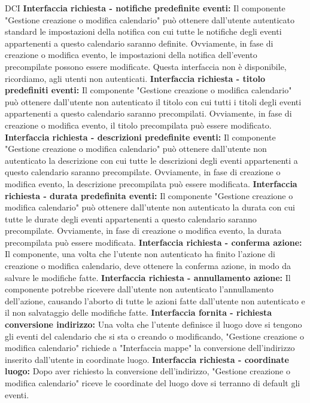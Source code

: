 \begin{listaPersonale}{DCI}
    \textbf{Interfaccia richiesta - notifiche predefinite eventi:} Il componente "Gestione creazione o modifica calendario" può ottenere dall'utente autenticato standard le impostazioni della notifica con cui tutte le notifiche degli eventi appartenenti a questo calendario saranno definite. Ovviamente, in fase di creazione o modifica evento, le impostazioni della notifica dell'evento precompilate possono essere modificate. Questa interfaccia non è disponibile, ricordiamo, agli utenti non autenticati.
    \textbf{Interfaccia richiesta - titolo predefiniti eventi:} Il componente "Gestione creazione o modifica calendario" può ottenere dall'utente non autenticato il titolo con cui tutti i titoli degli eventi appartenenti a questo calendario saranno precompilati. Ovviamente, in fase di creazione o modifica evento, il titolo precompilata può essere modificato.
    \textbf{Interfaccia richiesta - descrizioni predefinite eventi:} Il componente "Gestione creazione o modifica calendario" può ottenere dall'utente non autenticato la descrizione con cui tutte le descrizioni degli eventi appartenenti a questo calendario saranno precompilate. Ovviamente, in fase di creazione o modifica evento, la descrizione precompilata può essere modificata.
    \textbf{Interfaccia richiesta - durata predefinita eventi:} Il componente "Gestione creazione o modifica calendario" può ottenere dall'utente non autenticato la durata con cui tutte le durate degli eventi appartenenti a questo calendario saranno precompilate. Ovviamente, in fase di creazione o modifica evento, la durata precompilata può essere modificata.
    \textbf{Interfaccia richiesta - conferma azione:} Il componente, una volta che l'utente non autenticato ha finito l'azione di creazione o modifica calendario,  deve ottenere la conferma azione, in modo da salvare le modifiche fatte.
    \textbf{Interfaccia richiesta - annullamento azione:} Il componente potrebbe ricevere dall'utente non autenticato l'annullamento dell'azione, causando l'aborto di tutte le azioni fatte dall'utente non autenticato e il non salvataggio delle modifiche fatte.
    \textbf{Interfaccia fornita - richiesta conversione indirizzo:} Una volta che l'utente definisce il luogo dove si tengono gli eventi del calendario che si sta o creando o modificando, "Gestione creazione o modifica calendario" richiede a "Interfaccia mappe" la conversione dell'indirizzo inserito dall'utente in coordinate luogo.
    \textbf{Interfaccia richiesta - coordinate luogo:} Dopo aver richiesto la conversione dell'indirizzo, "Gestione creazione o modifica calendario" riceve le coordinate del luogo dove si terranno di default gli eventi.

\end{listaPersonale}
